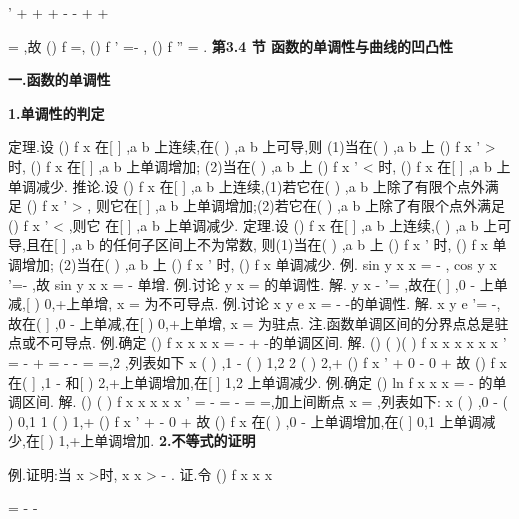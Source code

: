'
+
+
+
-
-
+
+








=
,故 
()
f
=,
()
f '
=-
,
()
f ''
=
. 
\vspace{6pt}
{\large \bfseries \textcolor{lyred}{第3.4 节 函数的单调性与曲线的凹凸性}}

\vspace{4pt}
{\bfseries \textcolor{lyred}{一.函数的单调性}}

{\bfseries \textcolor{lyred}{1.单调性的判定}}

\textcolor{lyred}{定理}.设
()
f x 在[
]
,a b 上连续,在(
)
,a b 上可导,则 
(1)当在(
)
,a b 上
()
f
x
'
>
时,
()
f x 在[
]
,a b 上单调增加; 
(2)当在(
)
,a b 上
()
f
x
'
<
时,
()
f x 在[
]
,a b 上单调减少. 
\textcolor{lyred}{推论}.设
()
f x 在[
]
,a b 上连续,(1)若它在(
)
,a b 上除了有限个点外满足
()
f
x
'
>
, 
则它在[
]
,a b 上单调增加;(2)若它在(
)
,a b 上除了有限个点外满足
()
f
x
'
<
,则它 
在[
]
,a b 上单调减少. 
\textcolor{lyred}{定理}.设
()
f x 在[
]
,a b 上连续,(
)
,a b 上可导,且在[
]
,a b 的任何子区间上不为常数, 
则(1)当在(
)
,a b 上
()
f
x
'
\ge 
时,
()
f x 单调增加; 
(2)当在(
)
,a b 上
()
f
x
'
\le 
时,
()
f x 单调减少. 
\textcolor{lyred}{例}.
sin
y
x
x
=
-
,
cos
y
x
'=-
\ge 
,故
sin
y
x
x
=
-
单增. 
\textcolor{lyred}{例}.讨论
y
x
=
的单调性. 
解.
y
x
-
'=
,故在(
]
,0
-\infty 
上单减,[
)
0,+\infty 上单增,
x =
为不可导点. 
\textcolor{lyred}{例}.讨论
x
y
e
x
=
-
-的单调性. 
解.
x
y
e
'=
-,故在(
]
,0
-\infty 
上单减,在[
)
0,+\infty 上单增,
x =
为驻点. 
\textcolor{lyred}{注}.函数单调区间的分界点总是驻点或不可导点. 
\textcolor{lyred}{例}.确定
()
f x
x
x
x
=
-
+
-的单调区间. 
解.
()
(
)(
)
f
x
x
x
x
x
x
'
=
-
+
=
-
-
=
\Rightarrow 
=,2 ,列表如下 
x       (
)
,1
-     (
)
1,2    2     (
)
2,+\infty  
()
f
x
'
     +      0      -      0       + 
故
()
f x 在(
]
,1
-\infty 
和[
)
2,+\infty 上单调增加,在[
]
1,2 上单调减少. 
\textcolor{lyred}{例}.确定
()
ln
f x
x
x
=
-
的单调区间. 
解.
()
(
)
f
x
x
x
x
x
'
=
-
=
-
=
\Rightarrow 
=,加上间断点
x =
,列表如下: 
x       (
)
,0
-     (
)
0,1    1     (
)
1,+\infty  
()
f
x
'
     +      \times       -      0      + 
故
()
f x 在(
)
,0
-\infty 
上单调增加,在(
]
0,1 上单调减少,在[
)
1,+\infty 上单调增加. 
{\bfseries \textcolor{lyred}{2.不等式的证明}}

\textcolor{lyred}{例}.证明:当
x >时,
x
x
>
-
. 
证.令
()
f x
x
x


=
-
-




